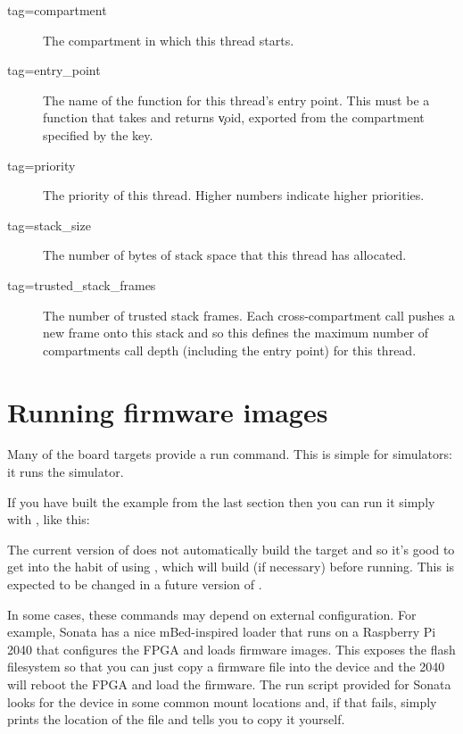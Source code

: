 \begin{description}
	\item[tag=compartment]{ The compartment in which this thread starts.}
	\item[tag=entry_point]{ The name of the function for this thread's entry point.
		This must be a function that takes and returns \c{void}, exported from the compartment specified by the  key.}
	\item[tag=priority]{ The priority of this thread.
		Higher numbers indicate higher priorities.}
	\item[tag=stack_size]{ The number of bytes of stack space that this thread has allocated.}
	\item[tag=trusted_stack_frames]{ The number of trusted stack frames.
		Each cross-compartment call pushes a new frame onto this stack and so this defines the maximum number of compartments call depth (including the entry point) for this thread.}
\end{description}

\section{Running firmware images}

Many of the board targets provide a run command.
This is simple for simulators: it runs the simulator.

If you have built the example from the last section then you can run it simply with , like this:


\begin{note}
	The current version of  does not automatically build the target and so it's good to get into the habit of using , which will build (if necessary) before running.
	This is expected to be changed in a future version of .
\end{note}

In some cases, these commands may depend on external configuration.
For example, Sonata has a nice mBed-inspired loader that runs on a Raspberry Pi 2040 that configures the FPGA and loads firmware images.
This exposes the flash filesystem so that you can just copy a firmware file into the  device and the 2040 will reboot the FPGA and load the firmware.
The run script provided for Sonata looks for the  device in some common mount locations and, if that fails, simply prints the location of the file and tells you to copy it yourself.

